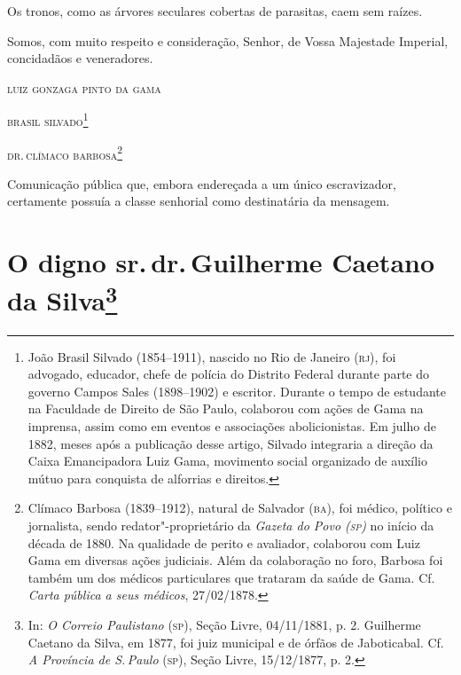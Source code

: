 Os tronos, como as árvores seculares cobertas de parasitas, caem sem
raízes.


Somos, com muito respeito e consideração, Senhor, de Vossa Majestade
Imperial, concidadãos e veneradores.

\hfill\textsc{luiz gonzaga pinto da gama}

\hfill\textsc{brasil silvado}\footnote{João Brasil Silvado (1854--1911), nascido no
  Rio de Janeiro (\textsc{rj}), foi advogado, educador, chefe de polícia do
  Distrito Federal durante parte do governo Campos Sales (1898--1902) e
  escritor. Durante o tempo de estudante na Faculdade de Direito de São
  Paulo, colaborou com ações de Gama na imprensa, assim como em eventos
  e associações abolicionistas. Em julho de 1882, meses após a
  publicação desse artigo, Silvado integraria a direção da Caixa
  Emancipadora Luiz Gama, movimento social organizado de auxílio mútuo
  para conquista de alforrias e direitos.}

\hfill\textsc{dr.\,clímaco barbosa}\footnote{Clímaco Barbosa (1839--1912), natural de
  Salvador (\textsc{ba}), foi médico, político e jornalista, sendo
  redator"-proprietário da \emph{Gazeta do Povo (\textsc{sp})} no início da década
  de 1880. Na qualidade de perito e avaliador, colaborou com Luiz Gama
  em diversas ações judiciais. Além da colaboração no foro, Barbosa foi
  também um dos médicos particulares que trataram da saúde de Gama. Cf.
  \emph{Carta pública a seus médicos}, 27/02/1878.}

\pagebreak
\mbox{}\vfill
\thispagestyle{empty}

{\small\noindent
Comunicação pública que, embora endereçada a um único
escravizador, certamente possuía a classe senhorial como destinatária da
mensagem.}

\chapter{O digno sr.\,dr.\,Guilherme Caetano da Silva\footnote[*]{In:
  \emph{O Correio Paulistano} (\textsc{sp}), Seção Livre, 04/11/1881, p. 2.
  Guilherme Caetano da Silva, em 1877, foi juiz municipal e de órfãos de
  Jaboticabal. Cf. \emph{A Província de S.\,Paulo} (\textsc{sp}), Seção Livre,
  15/12/1877, p. 2.}}


